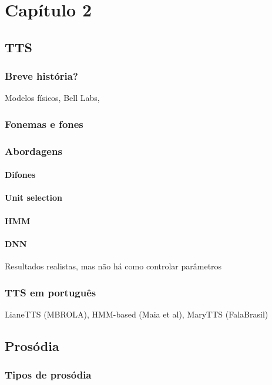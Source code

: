 \chapter{Capítulo 2}


\section{TTS}
\subsection{Breve história?}
Modelos físicos, Bell Labs, 
\subsection{Fonemas e fones}
\subsection{Abordagens}
\subsubsection{Difones}
\subsubsection{Unit selection}
\subsubsection{HMM}
\subsubsection{DNN}
Resultados realistas, mas não há como controlar parâmetros
\subsection{TTS em português}
LianeTTS (MBROLA), HMM-based (Maia et al), MaryTTS (FalaBrasil)
\section{Prosódia}
\subsection{Tipos de prosódia}
